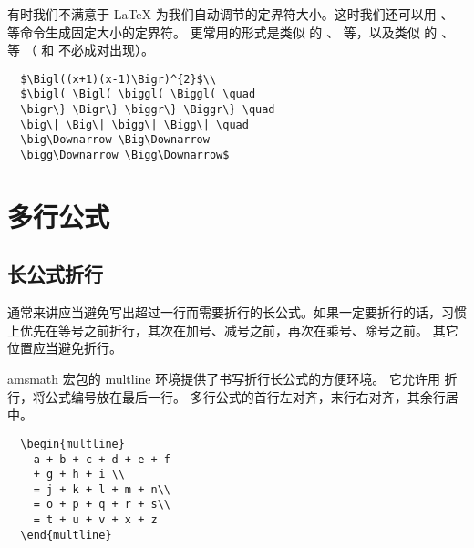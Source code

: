 \begin{center}
	\fbox{
		\parbox{20em}{
			\[1 + \left(\frac{1}{1-x^{2}}
			\right)^3 \qquad
			\left.\frac{\partial f}{\partial t}
			\right|_{t=0}\] 
		}
	}
\end{center}
有时我们不满意于 \LaTeX{} 为我们自动调节的定界符大小。这时我们还可以用 、 等命令生成固定大小的定界符。
更常用的形式是类似  的 、 等，以及类似  的 、 等
（ 和  不必成对出现）。
\begin{lstlisting}
  $\Bigl((x+1)(x-1)\Bigr)^{2}$\\
  $\bigl( \Bigl( \biggl( \Biggl( \quad
  \bigr\} \Bigr\} \biggr\} \Biggr\} \quad
  \big\| \Big\| \bigg\| \Bigg\| \quad
  \big\Downarrow \Big\Downarrow
  \bigg\Downarrow \Bigg\Downarrow$
\end{lstlisting}
\begin{center}
\end{center}

\section{多行公式}
\subsection{长公式折行}
通常来讲应当避免写出超过一行而需要折行的长公式。如果一定要折行的话，习惯上优先在等号之前折行，其次在加号、减号之前，再次在乘号、除号之前。
其它位置应当避免折行。

amsmath 宏包的 multline 环境提供了书写折行长公式的方便环境。
它允许用 \crcmd{} 折行，将公式编号放在最后一行。
多行公式的首行左对齐，末行右对齐，其余行居中。
\begin{lstlisting}
  \begin{multline}
    a + b + c + d + e + f
    + g + h + i \\
    = j + k + l + m + n\\
    = o + p + q + r + s\\
    = t + u + v + x + z
  \end{multline}
\end{lstlisting}
\begin{center}
\end{center}

